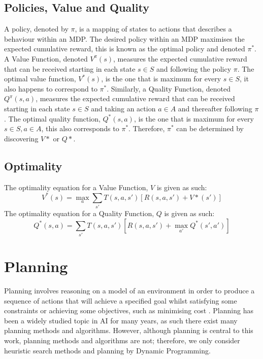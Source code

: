 \subsection{Policies, Value and Quality}
A policy, denoted by $\pi$, is a mapping of states to actions that describes a behaviour within an MDP. The desired policy within an MDP maximises the expected cumulative reward, this is known as the optimal policy and denoted $\pi^*$.
A Value Function, denoted $V^\pi(s)$, measures the expected cumulative reward that can be received starting in each state $s \in S$ and following the policy $\pi$. The optimal value function, $V^*(s)$, is the one that is maximum for every $s \in S$, it also happens to correspond to $\pi^*$.
Similarly, a Quality Function, denoted $Q^\pi(s,a)$, measures the expected cumulative reward that can be received starting in each state $s \in S$ and taking an action $a \in A$ and thereafter following $\pi$. The optimal quality function, $Q^*(s,a)$, is the one that is maximum for every $s \in S, a \in A$, this also corresponds to $\pi^*$. Therefore, $\pi^*$ can be determined by discovering $V*$ or $Q*$.
\subsection{Optimality}
The optimality equation for a Value Function, $V$ is given as such:
\begin{equation}
\label{eqn:vstar}
    V^*(s) = \max_a\sum_{s'}T(s,a,s')[R(s,a,s')+V*(s')]
\end{equation}
The optimality equation for a Quality Function, $Q$ is given as such:
\begin{equation}
\label{eqn:qstar}
Q^*(s,a) = \sum_{s'}T(s,a,s')[R(s,a,s')+\max_{a'}Q^*(s',a')]
\end{equation}

\section{Planning}
Planning involves reasoning on a model of an environment in order to produce a sequence of actions that will achieve a specified goal whilst satisfying some constraints or achieving some objectives, such as minimising cost \citep{DBLP:books/aw/RN2020, Lav06, GhallabNauTraverso04}. 
Planning has been a widely studied topic in AI for many years, as such there exist many planning methods and algorithms. However, although planning is central to this work, planning methods and algorithms are not; therefore, we only consider heuristic search methods and planning by Dynamic Programming.

